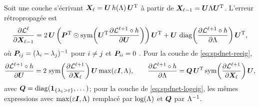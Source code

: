\begin{proposition}
\label{prop:spdnet-gradevd}
  Soit une couche s'écrivant $\boldsymbol{X}_\ell=\boldsymbol{U}\,h(\Lambda)\,\boldsymbol{U}^{\mathrm{T}}$ à
  partir de $\boldsymbol{X}_{\ell-1}=\boldsymbol{U}\Lambda\boldsymbol{U}^{\mathrm{T}}$. L'erreur rétropropagée est
  \begin{equation}
    \frac{\partial \mathcal{L}^{\ell}}{\partial \boldsymbol{X}_{\ell-1}}
    =
    2\,\boldsymbol{U}\left(\boldsymbol{P}^{\mathrm{T}}\odot\operatorname{\operatorname{sym}}\!\left(\boldsymbol{U}^{\mathrm{T}}\frac{\partial \mathcal{L}^{\ell+1}\circ h}{\partial \boldsymbol{U}}\right)\right)\boldsymbol{U}^{\mathrm{T}}
    +
    \boldsymbol{U}\,\operatorname{\operatorname{diag}}\!\left(\frac{\partial \mathcal{L}^{\ell+1}\circ h}{\partial \Lambda}\right)\boldsymbol{U}^{\mathrm{T}},
    \label{eq:spdnet-gradevd}
  \end{equation}
  où $\boldsymbol{P}_{ij}=(\lambda_i-\lambda_j)^{-1}$ pour
  $i\neq j$ et $\boldsymbol{P}_{ii}=0$
  . Pour la couche
  \ReEig{} de \cref{eq:spdnet-reeig},
  \begin{equation}
    \frac{\partial \mathcal{L}^{\ell+1}\circ h}{\partial \boldsymbol{U}}
    =
    2\,\operatorname{\operatorname{sym}}\!\left(\frac{\partial \mathcal{L}^{\ell+1}}{\partial \boldsymbol{X}_{\ell}}\right)\boldsymbol{U}\max(\varepsilon\boldsymbol{I}_{},\Lambda),
    \qquad
    \frac{\partial \mathcal{L}^{\ell+1}\circ h}{\partial \Lambda}
    =
    \boldsymbol{Q}\,\boldsymbol{U}^{\mathrm{T}}\operatorname{\operatorname{sym}}\!\left(\frac{\partial \mathcal{L}^{\ell+1}}{\partial \boldsymbol{X}_{\ell}}\right)\boldsymbol{U},
    \label{eq:spdnet-gradreeig}
  \end{equation}
  avec $\boldsymbol{Q}=\operatorname{\operatorname{diag}}(\mathbf{1}_{\{\lambda_1>\varepsilon\}},\dots)$; pour la couche
  \LogEig{} de \cref{eq:spdnet-logeig}, les mêmes expressions avec
  $\max(\varepsilon\boldsymbol{I}_{},\Lambda)$ remplacé par $\log(\Lambda)$ et $\boldsymbol{Q}$ par
  ${\Lambda}^{-1}$.
\end{proposition}


